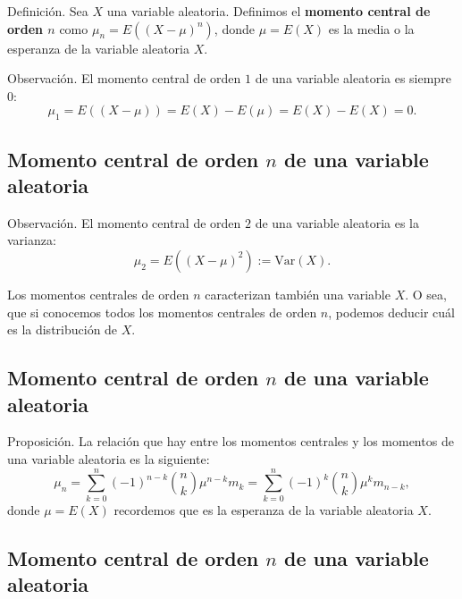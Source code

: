 \documentclass[]{book}
\begin{document}
 Definición.
Sea \(X\) una variable aleatoria. Definimos el \textbf{momento central de orden \(n\)} como
\(\mu_n = E\left((X-\mu)^n\right)\), donde \(\mu =E(X)\) es la media o la esperanza de la variable aleatoria \(X\).

 Observación.
El momento central de orden \(1\) de una variable aleatoria es siempre 0:
\[
\mu_1 = E\left((X-\mu)\right)=E(X)-E(\mu)=E(X)-E(X)=0.
\]

\hypertarget{momento-central-de-orden-n-de-una-variable-aleatoria-1}{%
\subsection{\texorpdfstring{Momento central de orden \(n\) de una variable aleatoria}{Momento central de orden n de una variable aleatoria}}\label{momento-central-de-orden-n-de-una-variable-aleatoria-1}}

 Observación.
El momento central de orden \(2\) de una variable aleatoria es la varianza:
\[
\mu_2 = E\left((X-\mu)^2\right):= \mathrm{Var}(X).
\]

Los momentos centrales de orden \(n\) caracterizan también una variable \(X\). O sea, que si conocemos todos los momentos centrales de orden \(n\), podemos deducir cuál es la distribución de \(X\).

\hypertarget{momento-central-de-orden-n-de-una-variable-aleatoria-2}{%
\subsection{\texorpdfstring{Momento central de orden \(n\) de una variable aleatoria}{Momento central de orden n de una variable aleatoria}}\label{momento-central-de-orden-n-de-una-variable-aleatoria-2}}

 Proposición.
La relación que hay entre los momentos centrales y los momentos de una variable aleatoria es la siguiente:
\[
\mu_n = \sum_{k=0}^n (-1)^{n-k} \binom{n}{k} \mu^{n-k} m_k = \sum_{k=0}^n (-1)^{k} \binom{n}{k} \mu^{k} m_{n-k},
\]
donde \(\mu =E(X)\) recordemos que es la esperanza de la variable aleatoria \(X\).

\hypertarget{momento-central-de-orden-n-de-una-variable-aleatoria-3}{%
\subsection{\texorpdfstring{Momento central de orden \(n\) de una variable aleatoria}{Momento central de orden n de una variable aleatoria}}\label{momento-central-de-orden-n-de-una-variable-aleatoria-3}}
\end{document}
